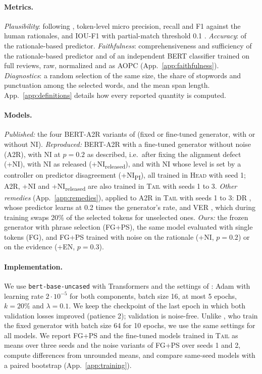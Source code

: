 \documentclass[11pt]{article}
\newcommand{\HEAD}{\textup{\textsc{Head}}}
\newcommand{\TAIL}{\textup{\textsc{Tail}}}
\begin{document}
\paragraph{Metrics.}
\emph{Plausibility}: following \citet{storek-etal-2023-unsupervised}, token-level micro precision, recall and F1 against the human rationales, and IOU-F1 with partial-match threshold 0.1 \citep{deyoung-etal-2020-eraser,paranjape-etal-2020-information}. \emph{Accuracy}: of the rationale-based predictor. \emph{Faithfulness}: comprehensiveness and sufficiency \citep{deyoung-etal-2020-eraser} of the rationale-based predictor and of an independent BERT classifier trained on full reviews, raw, normalized \citep{carton-etal-2020-evaluating} and as AOPC (App.~\ref{app:faithfulness}). \emph{Diagnostics}: a random selection of the same size, the share of stopwords and punctuation among the selected words, and the mean span length. App.~\ref{app:definitions} details how every reported quantity is computed.

\paragraph{Models.}
\emph{Published:} the four BERT-A2R variants of \citet{storek-etal-2023-unsupervised} (fixed or fine-tuned generator, with or without NI). \emph{Reproduced:} BERT-A2R with a fine-tuned generator without noise (A2R), with NI at $p = 0.2$ as described, i.e.\ after fixing the alignment defect (+NI), with NI as released (+NI\textsubscript{released}), and with NI whose level is set by a controller on predictor disagreement (+NI\textsubscript{PI}), all trained in \HEAD{} with seed 1; A2R, +NI and +NI\textsubscript{released} are also trained in \TAIL{} with seeds 1 to 3. \emph{Other remedies} (App.~\ref{app:remedies}), applied to A2R in \TAIL{} with seeds 1 to 3: DR \citep{liu2023dr}, whose predictor learns at 0.2 times the generator's rate, and VER \citep{liu-etal-2025-exploring}, which during training swaps 20\% of the selected tokens for unselected ones. \emph{Ours:} the frozen generator with phrase selection (FG+PS), the same model evaluated with single tokens (FG), and FG+PS trained with noise on the rationale (+NI, $p = 0.2$) or on the evidence (+EN, $p = 0.3$).

\paragraph{Implementation.}
We use \texttt{bert-base-uncased} with Transformers \citep{wolf-etal-2020-transformers} and the settings of \citet{storek-etal-2023-unsupervised}: Adam \citep{kingma2015adam} with learning rate $2 \cdot 10^{-5}$ for both components, batch size 16, at most 5 epochs, $k = 20\%$ and $\lambda = 0.1$. We keep the checkpoint of the last epoch in which both validation losses improved (patience 2); validation is noise-free. Unlike \citet{storek-etal-2023-unsupervised}, who train the fixed generator with batch size 64 for 10 epochs, we use the same settings for all models. We report FG+PS and the fine-tuned models trained in \TAIL{} as means over three seeds and the noise variants of FG+PS over seeds 1 and 2, compute differences from unrounded means, and compare same-seed models with a paired bootstrap (App.~\ref{app:training}).
\end{document}
